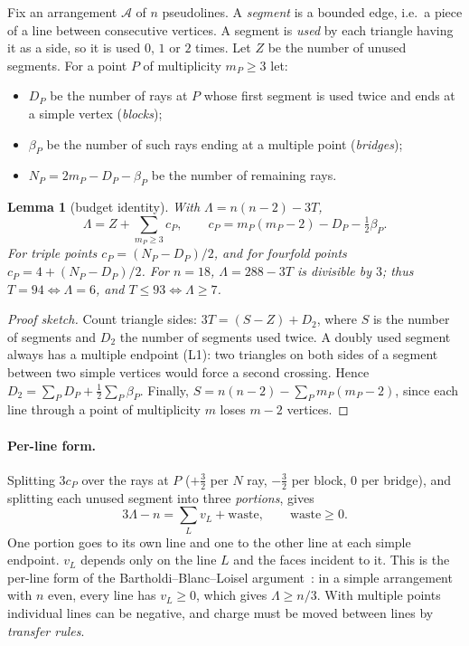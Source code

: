 \documentclass[11pt]{article}
\newtheorem{lemma}[theorem]{Lemma}
\theoremstyle{definition}
\theoremstyle{remark}
\newcommand{\Lam}{\Lambda}
\begin{document}
Fix an arrangement $\mathcal A$ of $n$ pseudolines. A \emph{segment} is a bounded edge, i.e.\ a piece of a line
between consecutive vertices. A segment is \emph{used} by each triangle having it as a side, so it is used $0$, $1$
or $2$ times. Let $Z$ be the number of unused segments. For a point $P$ of multiplicity $m_P\ge 3$ let:
\begin{itemize}[nosep]
\item $D_P$ be the number of rays at $P$ whose first segment is used twice and ends at a simple vertex (\emph{blocks});
\item $\beta_P$ be the number of such rays ending at a multiple point (\emph{bridges});
\item $N_P=2m_P-D_P-\beta_P$ be the number of remaining rays.
\end{itemize}

\begin{lemma}[budget identity]\label{lem:budget}
With $\Lam=n(n-2)-3T$,
\[
\Lam = Z+\sum_{m_P\ge 3}c_P,\qquad c_P=m_P(m_P-2)-D_P-\tfrac12\beta_P .
\]
For triple points $c_P=(N_P-D_P)/2$, and for fourfold points $c_P=4+(N_P-D_P)/2$. For $n=18$, $\Lam=288-3T$ is
divisible by $3$; thus $T=94\iff\Lam=6$, and $T\le 93\iff\Lam\ge 7$.
\end{lemma}
\begin{proof}[Proof sketch]
Count triangle sides: $3T=(S-Z)+D_2$, where $S$ is the number of segments and $D_2$ the number of segments used twice.
A doubly used segment always has a multiple endpoint (L1): two triangles on both sides of a segment between two simple
vertices would force a second crossing. Hence $D_2=\sum_P D_P+\tfrac12\sum_P\beta_P$. Finally,
$S=n(n-2)-\sum_P m_P(m_P-2)$, since each line through a point of multiplicity $m$ loses $m-2$ vertices.
\end{proof}

\paragraph{Per-line form.} Splitting $3c_P$ over the rays at $P$ ($+\tfrac32$ per $N$ ray, $-\tfrac32$ per block, $0$ per
bridge), and splitting each unused segment into three \emph{portions}, gives
\[
3\Lam-n=\sum_L v_L+\mathrm{waste},\qquad \mathrm{waste}\ge 0 .
\]
One portion goes to its own line and one to the other line at each simple endpoint. $v_L$ depends only on the line
$L$ and the faces incident to it. This is the per-line form of the Bartholdi--Blanc--Loisel argument~\cite{bbl}: in a
simple arrangement with $n$ even, every line has $v_L\ge 0$, which gives $\Lam\ge n/3$. With multiple points individual
lines can be negative, and charge must be moved between lines by \emph{transfer rules}.
\end{document}
